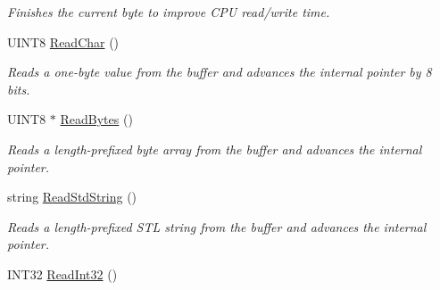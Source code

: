 \begin{DoxyCompactItemize}
\begin{DoxyCompactList}\small\item\em Finishes the current byte to improve C\-P\-U read/write time. \end{DoxyCompactList}\item 
\hypertarget{class_rhesus_1_1_toolkit_1_1_net_1_1_net_buffer_a774cf83e844eeac761d56419fb57a03e}{U\-I\-N\-T8 \hyperlink{class_rhesus_1_1_toolkit_1_1_net_1_1_net_buffer_a774cf83e844eeac761d56419fb57a03e}{Read\-Char} ()}\label{class_rhesus_1_1_toolkit_1_1_net_1_1_net_buffer_a774cf83e844eeac761d56419fb57a03e}

\begin{DoxyCompactList}\small\item\em Reads a one-\/byte value from the buffer and advances the internal pointer by 8 bits. \end{DoxyCompactList}\item 
\hypertarget{class_rhesus_1_1_toolkit_1_1_net_1_1_net_buffer_a5ae0249e846fae97674597d3b43f92ce}{U\-I\-N\-T8 $\ast$ \hyperlink{class_rhesus_1_1_toolkit_1_1_net_1_1_net_buffer_a5ae0249e846fae97674597d3b43f92ce}{Read\-Bytes} ()}\label{class_rhesus_1_1_toolkit_1_1_net_1_1_net_buffer_a5ae0249e846fae97674597d3b43f92ce}

\begin{DoxyCompactList}\small\item\em Reads a length-\/prefixed byte array from the buffer and advances the internal pointer. \end{DoxyCompactList}\item 
\hypertarget{class_rhesus_1_1_toolkit_1_1_net_1_1_net_buffer_a2cd79cb9c3c746b57b0f7d9f5ac64ca6}{string \hyperlink{class_rhesus_1_1_toolkit_1_1_net_1_1_net_buffer_a2cd79cb9c3c746b57b0f7d9f5ac64ca6}{Read\-Std\-String} ()}\label{class_rhesus_1_1_toolkit_1_1_net_1_1_net_buffer_a2cd79cb9c3c746b57b0f7d9f5ac64ca6}

\begin{DoxyCompactList}\small\item\em Reads a length-\/prefixed S\-T\-L string from the buffer and advances the internal pointer. \end{DoxyCompactList}\item 
\hypertarget{class_rhesus_1_1_toolkit_1_1_net_1_1_net_buffer_a9eec38fcaaa533abe3ebf308c1428f72}{I\-N\-T32 \hyperlink{class_rhesus_1_1_toolkit_1_1_net_1_1_net_buffer_a9eec38fcaaa533abe3ebf308c1428f72}{Read\-Int32} ()}\label{class_rhesus_1_1_toolkit_1_1_net_1_1_net_buffer_a9eec38fcaaa533abe3ebf308c1428f72}


\end{DoxyCompactItemize}
